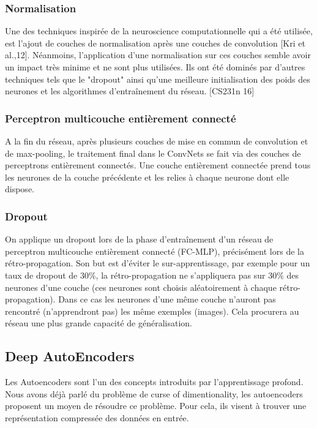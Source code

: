 \subsubsection{Normalisation}

	Une des techniques inspirée de la neuroscience computationnelle qui a été utilisée, est l'ajout de couches de normalisation après une couches de convolution [Kri et al.,12]. Néanmoins, l'application d'une normalisation sur ces couches semble avoir un impact très minime et ne sont plus utilisées. Ils ont été dominés par d'autres techniques tels que le "dropout" ainsi qu'une meilleure initialisation des poids des neurones et les algorithmes d'entraînement du réseau. [CS231n 16]
	
\subsubsection{Perceptron multicouche entièrement connecté}

	A la fin du réseau, après plusieurs couches de mise en commun de convolution et de max-pooling, le traitement final dans le ConvNets se fait via des couches de perceptrons entièrement connectés. Une couche entièrement connectée prend tous les neurones de la couche précédente et les relies à chaque neurone dont elle dispose.

\subsubsection{Dropout}

	On applique un dropout lors de la phase d'entraînement d'un réseau de perceptron multicouche entièrement connecté (FC-MLP), précisément lors de la rétro-propagation. Son but est d'éviter le sur-apprentissage, par exemple pour un taux de dropout de 30\%, la rétro-propagation ne s'appliquera pas sur 30\% des neurones d'une couche (ces neurones sont choisis aléatoirement à chaque rétro-propagation). Dans ce cas les neurones d'une même couche n'auront pas rencontré (n'apprendront pas) les même exemples (images). Cela procurera au réseau une plus grande capacité de généralisation.

\subsection{Deep AutoEncoders}

	Les Autoencoders sont l'un des concepts introduits par l'apprentissage profond. Nous avons déjà parlé du problème de curse of dimentionality, les autoencoders proposent un moyen de résoudre ce problème. Pour cela, ils visent à trouver une représentation compressée des données en entrée.
	
